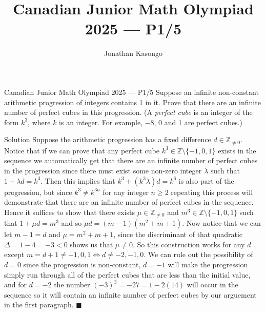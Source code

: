 \documentclass{article}
\author{Jonathan Kasongo}
\title{Canadian Junior Math Olympiad 2025 --- P1/5}
\begin{document}
\maketitle

\begin{problem}{Canadian Junior Math Olympiad 2025 --- P1/5}
Suppose an infinite non-constant arithmetic progression of integers contains 1 in it. Prove that
there are an infinite number of perfect cubes in this progression. (A \textit{perfect cube} is an integer
of the form $k^3$, where $k$ is an integer. For example, $-8$, 0 and 1 are perfect cubes.)
\end{problem}

\begin{solution}{Solution}
Suppose the arithmetic progression has a fixed difference $d \in
\mathbb{Z}_{\neq 0}$. Notice that if we can prove that any perfect cube
$k^3 \in \mathbb{Z} \setminus \{ -1, 0, 1\}$ exists in the sequence we
automatically get that there
are an infinite number of perfect cubes in the progression since
there must exist some non-zero integer $\lambda$ such that
$1+ \lambda d = k^3$. Then this implies that $k^3 + (k^3\lambda) d = k^6$
is also part of the progression, but since $k^3 \neq k^{3n}$ for any
integer $n \geq 2$ repeating this
process will demonstrate that there are an infinite number of perfect cubes
in the sequence.\\

Hence it suffices to show that there exists $\mu \in \mathbb{Z}_{\neq 0}$
and $m^3 \in \mathbb{Z} \setminus \{ -1, 0, 1\}$ such that
$1 + \mu d = m^3$ and so $\mu d = (m - 1)(m^2 + m + 1)$. Now notice
that we can let $m - 1 = d$ and $\mu = m^2 + m + 1$, since
the discriminant of that quadratic $\Delta = 1 - 4 = -3 < 0$ shows us that
$\mu \neq 0$. So this construction works for any $d$ except $m = d+1 \neq
-1, 0, 1 \iff d \neq -2, -1, 0$. We can rule out the possibility of $d=0$
since the progression is non-constant, $d=-1$ will make the progression
simply run through all of the perfect cubes that are less than the initial
value, and for $d=-2$ the number $(-3)^3 = -27 = 1 - 2(14)$ will occur in
the sequence so it will contain an infinite number of perfect cubes by our
arguement in the first paragraph. $\blacksquare$
\end{solution}
\end{document}
